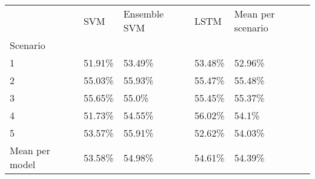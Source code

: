 \begin{tabular}{lllll}
\toprule
 & SVM & Ensemble SVM & LSTM & Mean per scenario \\
Scenario &  &  &  &  \\
\midrule
1 & 51.91\% & 53.49\% & 53.48\% & 52.96\% \\
2 & 55.03\% & 55.93\% & 55.47\% & 55.48\% \\
3 & 55.65\% & 55.0\% & 55.45\% & 55.37\% \\
4 & 51.73\% & 54.55\% & 56.02\% & 54.1\% \\
5 & 53.57\% & 55.91\% & 52.62\% & 54.03\% \\
Mean per model & 53.58\% & 54.98\% & 54.61\% & 54.39\% \\
\bottomrule
\end{tabular}
